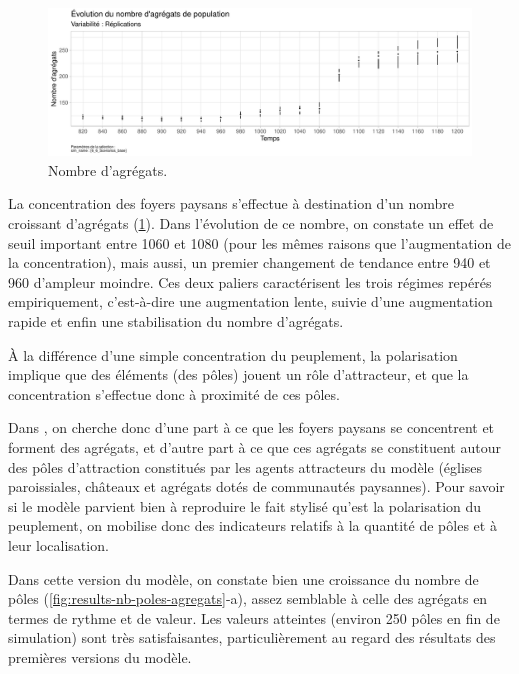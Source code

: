 \begin{figure}[H]
	\centering
	\includegraphics[width=\linewidth]{img/results_6_6/Agregats_Nb_Haut.pdf}
	\caption{Nombre d'agrégats.}
	\label{fig:results-nb-agregrats}
\end{figure}

La concentration des foyers paysans s'effectue à destination d'un nombre croissant d'agrégats (\cref{fig:results-nb-agregrats}).
Dans l'évolution de ce nombre, on constate un effet de seuil important entre 1060 et 1080 (pour les mêmes raisons que l'augmentation de la concentration), mais aussi, un premier changement de tendance entre 940 et 960 d'ampleur moindre.
Ces deux paliers caractérisent les trois régimes repérés empiriquement, c'est-à-dire une augmentation lente, suivie d'une augmentation rapide et enfin une stabilisation du nombre d'agrégats.

À la différence d'une simple concentration du peuplement, la polarisation implique que des éléments (des pôles) jouent un rôle d'attracteur, et que la concentration s'effectue donc à proximité de ces pôles.

Dans \simfeodal{}, on cherche donc d'une part à ce que les foyers paysans se concentrent et forment des agrégats, et d'autre part à ce que ces agrégats se constituent autour des pôles d'attraction constitués par les agents attracteurs du modèle (églises paroissiales, châteaux et agrégats dotés de communautés paysannes).
Pour savoir si le modèle parvient bien à reproduire le fait stylisé qu'est la polarisation du peuplement, on mobilise donc des indicateurs relatifs à la quantité de pôles et à leur localisation.

Dans cette version du modèle, on constate bien une croissance du nombre de pôles (\cref{fig:results-nb-poles-agregats}-a), assez semblable à celle des agrégats en termes de rythme et de valeur.
Les valeurs atteintes (environ 250 pôles en fin de simulation) sont très satisfaisantes, particulièrement au regard des résultats des premières versions du modèle.

